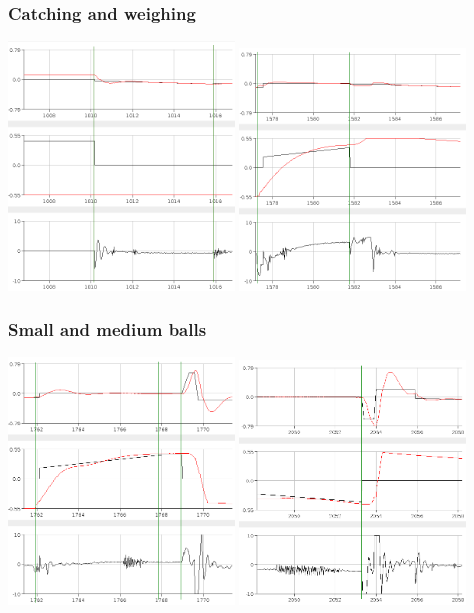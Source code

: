 \documentclass[
compress]
{beamer}
\begin{document}
\begin{frame}
\frametitle{Catching and weighing}
\centering
\includegraphics[width=0.45\textwidth]{figures/topickupposition-crop.png}
\hspace{1em}
\includegraphics[width=0.45\textwidth]{figures/weighanddroplargeball-crop.png}
\end{frame}

\begin{frame}
\frametitle{Small and medium balls}
\centering
\includegraphics[width=0.45\textwidth]{figures/weighandthrowsmallball-crop.png}
\hspace{1em}
\includegraphics[width=0.45\textwidth]{figures/throwmediumball-crop.png}
\end{frame}
\end{document}
